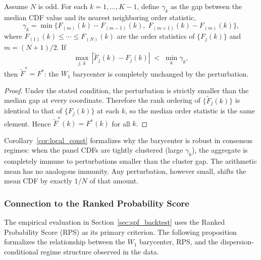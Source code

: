 \begin{corollary}
\label{cor:local_const}
Assume $N$ is odd.  For each $k = 1,\ldots,K-1$, define $\gamma_k$ as the gap between the median CDF value and its nearest neighboring order statistic,
\[
  \gamma_k = \min\bigl\{F_{(m)}(k) - F_{(m-1)}(k),\; F_{(m+1)}(k) - F_{(m)}(k)\bigr\},
\]
where $F_{(1)}(k)\leq\cdots\leq F_{(N)}(k)$ are the order statistics of $\{F_j(k)\}$ and $m = (N+1)/2$.  If
\[
  \max_{j,\,k}\,|\tilde F_j(k) - F_j(k)| \;<\; \min_k \gamma_k,
\]
then $\tilde F^* = F^*$: the $W_1$ barycenter is completely unchanged by the perturbation.
\end{corollary}
\begin{proof}
Under the stated condition, the perturbation is strictly smaller than the median gap at every coordinate.  Therefore the rank ordering of $\{\tilde F_j(k)\}$ is identical to that of $\{F_j(k)\}$ at each $k$, so the median order statistic is the same element.  Hence $\tilde F^*(k)=F^*(k)$ for all $k$.
\end{proof}

\begin{remark}
Corollary~\ref{cor:local_const} formalizes why the barycenter is robust in consensus regimes: when the panel CDFs are tightly clustered (large $\gamma_k$), the aggregate is completely immune to perturbations smaller than the cluster gap.  The arithmetic mean has no analogous immunity. Any perturbation, however small, shifts the mean CDF by exactly $1/N$ of that amount.
\end{remark}

\subsubsection*{Connection to the Ranked Probability Score}

The empirical evaluation in Section~\ref{sec:spf_backtest} uses the Ranked Probability Score (RPS) as its primary criterion.  The following proposition formalizes the relationship between the $W_1$ barycenter, RPS, and the dispersion-conditional regime structure observed in the data.

